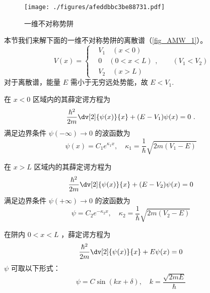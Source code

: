 
\begin{issues}
\issueTODO
{}
\end{issues}

\begin{figure}[ht]
\centering
\texttt{[image: ./figures/afeddbbc3be88731.pdf]}
\caption{一维不对称势阱} \label{fig_AMW_1}
\end{figure}
本节我们来解下面的一维不对称势阱的离散谱（\autoref{fig_AMW_1}）。
\begin{equation}
V(x)=\left\{\begin{aligned}
&V_1\quad(x<0)\\
&0\quad (0<x<L)\\
&V_2\quad(x>L)
\end{aligned}\right.
,\qquad (V_1 < V_2)
\end{equation}
对于离散谱，能量 $E$ 需小于无穷远处势能，故 $E<V_1$. 

在 $x<0$ 区域内的其薛定谔方程为
\begin{equation}
\frac{\hbar^2}{2m}\dv[2]{\psi(x)}{x}+(E-V_1)\psi(x)=0~.
\end{equation}
满足边界条件 $\psi(-\infty)\to 0$ 的波函数为
\begin{equation}
\psi(x)=C_1 e^{\kappa_1 x},\quad \kappa_1=\frac{1}{\hbar}\sqrt{2m(V_1-E)}
\end{equation}

在 $x>L$ 区域内的其薛定谔方程为
\begin{equation}
\frac{\hbar^2}{2m}\dv[2]{\psi(x)}{x}+(E-V_2)\psi(x)=0
\end{equation}
满足边界条件 $\psi(+\infty)\to 0$ 的波函数为
\begin{equation}
\psi=C_2 e^{-\kappa_2 x},\quad \kappa_2=\frac{1}{\hbar}\sqrt{2m(V_2-E)}
\end{equation}

在阱内 $0 < x < L$ ，薛定谔方程为
\begin{equation}
\frac{\hbar^2}{2m}\dv[2]{\psi(x)}{x}+E\psi(x)=0
\end{equation}
$\psi$ 可取以下形式：
\begin{equation}
\psi=C\sin(kx+\delta),\quad k=\frac{\sqrt{2mE}}{\hbar}
\end{equation}

